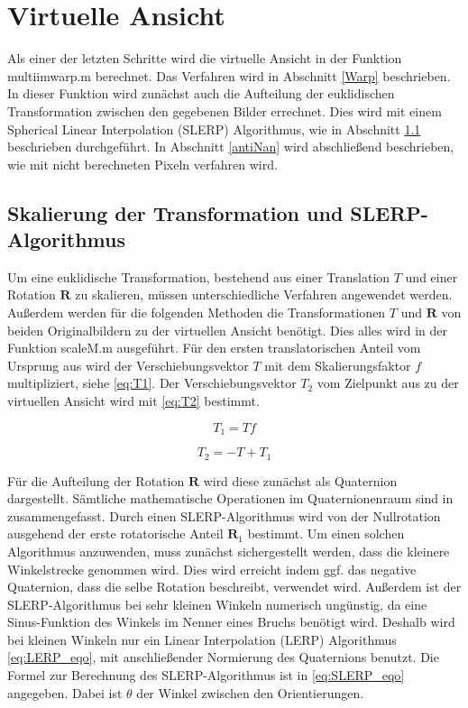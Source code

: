 \section{Virtuelle Ansicht}

Als einer der letzten Schritte wird die virtuelle Ansicht in der Funktion \mbox{\glqq multiimwarp.m\grqq{}} berechnet. Das Verfahren wird in Abschnitt \ref{Warp} beschrieben. In dieser Funktion wird zunächst auch die Aufteilung der euklidischen Transformation zwischen den gegebenen Bilder errechnet. Dies wird mit einem \glqq Spherical Linear Interpolation\grqq{} (SLERP) Algorithmus, wie in Abschnitt \ref{SLERP} beschrieben durchgeführt. In Abschnitt \ref{antiNan} wird abschließend beschrieben, wie mit nicht berechneten Pixeln verfahren wird.

\subsection{Skalierung der Transformation und SLERP-Algorithmus}\label{SLERP} 

Um eine euklidische Transformation, bestehend aus einer Translation $T$ und einer Rotation $\boldsymbol{R}$ zu skalieren, müssen unterschiedliche Verfahren angewendet werden. Außerdem werden für die folgenden Methoden die Transformationen $T$ und $\boldsymbol{R}$ von beiden Originalbildern zu der virtuellen Ansicht benötigt. Dies alles wird in der Funktion \glqq scaleM.m\grqq{} ausgeführt. Für den ersten translatorischen Anteil vom Ursprung aus wird der Verschiebungsvektor $T$ mit dem Skalierungsfaktor $f$ multipliziert, siehe \ref{eq:T1}. Der Verschiebungsvektor $T_2$ vom Zielpunkt aus zu der virtuellen Ansicht wird mit \ref{eq:T2} bestimmt. 

\begin{equation}
\label{eq:T1}
T_1 = T f
\end{equation}

\begin{equation}
\label{eq:T2}
T_2 = -T+T_1
\end{equation}

Für die Aufteilung der Rotation $\boldsymbol{R}$ wird diese zunächst als Quaternion dargestellt. Sämtliche mathematische Operationen im Quaternionenraum sind in \cite{Dam} zusammengefasst. Durch einen SLERP-Algorithmus wird von der Nullrotation ausgehend der erste rotatorische Anteil $\boldsymbol{R}_1$ bestimmt. Um einen solchen Algorithmus anzuwenden, muss zunächst sichergestellt werden, dass die kleinere Winkelstrecke genommen wird. Dies wird erreicht indem ggf. das negative Quaternion, dass die selbe Rotation beschreibt, verwendet wird. Außerdem ist der SLERP-Algorithmus bei sehr kleinen Winkeln numerisch ungünstig, da eine Sinus-Funktion des Winkels im Nenner eines Bruchs benötigt wird. Deshalb wird bei kleinen Winkeln nur ein \glqq Linear Interpolation\grqq{} (LERP) Algorithmus \ref{eq:LERP_eqo}, mit anschließender Normierung des Quaternions benutzt. Die Formel zur Berechnung des SLERP-Algorithmus ist in \ref{eq:SLERP_eqo} angegeben. Dabei ist $\theta$ der Winkel zwischen den Orientierungen. 

